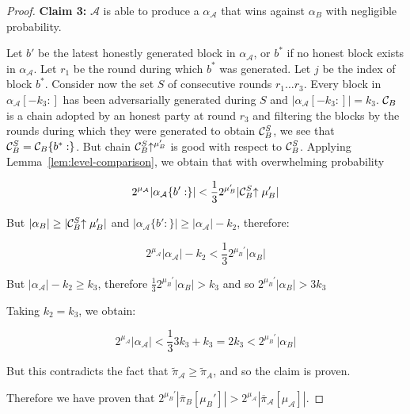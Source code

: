 \begin{proof}
    \textbf{Claim 3: } $\mathcal{A}$ is able to produce a $\alpha_\mathcal{A}$
    that wins against $\alpha_B$ with negligible probability.

    Let $b'$ be the latest honestly generated block in $\alpha_\mathcal{A}$, or
    $b^*$ if no honest block exists in $\alpha_\mathcal{A}$. Let $r_1$ be the
    round during which $b^*$ was generated. Let $j$ be the index of block $b^*$.
    Consider now the set $S$ of consecutive rounds $r_1 \ldots r_3$. Every block
    in $\alpha_\mathcal{A}[-k_3:]$ has been adversarially generated during $S$
    and $|\alpha_\mathcal{A}[-k_3:]| = k_3$. $\mathcal{C}_B$ is a chain adopted by an
    honest party at round $r_3$ and filtering the blocks by the rounds during
    which they were generated to obtain $\mathcal{C}_B^S$, we see that $\mathcal{C}_B^S =
    \mathcal{C}_B\{b^*:\}$. But chain $\mathcal{C}_B^S\negthickspace\uparrow^{\mu_B'}$ is good with
    respect to $\mathcal{C}_B^S$. Applying Lemma~\ref{lem:level-comparison}, we
    obtain that with overwhelming probability

    \begin{equation*}
    2^{\mu_\mathcal{A}}|\alpha_\mathcal{A}\{b':\}| <
    \frac{1}{3}2^{\mu_B'}|\mathcal{C}_B^S\negthickspace\uparrow{\mu_B'}|
    \end{equation*}

    But $|\alpha_B| \geq |\mathcal{C}_B^S\negthickspace\uparrow{\mu_B'}|$ and
    $|\alpha_\mathcal{A}\{b':\}| \geq |\alpha_\mathcal{A}| - k_2$, therefore:

    \begin{equation*}
    2^{\mu_\mathcal{A}}|\alpha_\mathcal{A}| - k_2 <
    \frac{1}{3}2^{\mu_B'}|\alpha_B|
    \end{equation*}

    But $|\alpha_\mathcal{A}| - k_2 \geq k_3$, therefore
    $\frac{1}{3}2^{\mu_B'}|\alpha_B| > k_3$ and so $2^{\mu_B'}|\alpha_B| > 3k_3$

    Taking $k_2 = k_3$, we obtain:

    \begin{equation*}
    2^{\mu_\mathcal{A}}|\alpha_\mathcal{A}| <
    \frac{1}{3}3k_3 + k_3 = 2k_3 < 2^{\mu_B'}|\alpha_B|
    \end{equation*}

    But this contradicts the fact that
    $\tilde\pi_\mathcal{A} \geq \tilde\pi_A$, and so the claim is proven.

    Therefore we have proven that $2^{\mu_B'}|\overline\pi_B[\mu_B']| >
    2^{\mu_\mathcal{A}}|\overline\pi_\mathcal{A}[\mu_\mathcal{A}]|$.


\end{proof}
